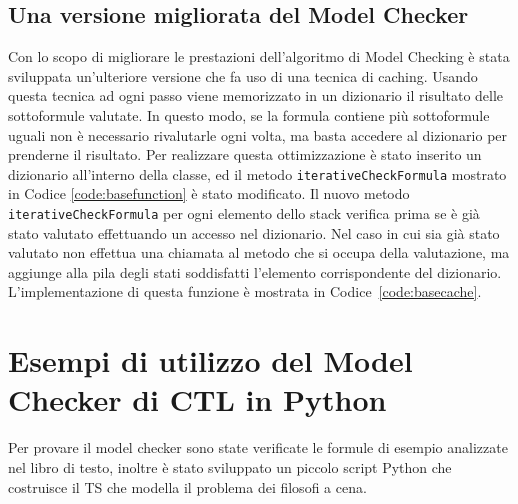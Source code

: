 \documentclass[a4paper, 10pt]{article}
\numberwithin{equation}{theor}
\begin{document}
\subsection{Una versione migliorata del Model Checker}
Con lo scopo di migliorare le prestazioni dell'algoritmo di Model Checking è stata sviluppata un'ulteriore versione che fa uso di una tecnica di caching. Usando questa tecnica ad ogni passo viene memorizzato in un dizionario il risultato delle sottoformule valutate. In questo modo, se la formula contiene più sottoformule uguali non è necessario rivalutarle ogni volta, ma basta accedere al dizionario per prenderne il risultato.
Per realizzare questa ottimizzazione è stato inserito un dizionario all'interno della classe, ed il metodo \texttt{iterativeCheckFormula} mostrato in Codice \ref{code:basefunction} è stato modificato. Il nuovo metodo \texttt{iterativeCheckFormula} per ogni elemento dello stack verifica prima se è già stato valutato effettuando un accesso nel dizionario. Nel caso in cui sia già stato valutato non effettua una chiamata al metodo che si occupa della valutazione, ma aggiunge alla pila degli stati soddisfatti l'elemento corrispondente del dizionario. L'implementazione di questa funzione è mostrata in Codice~\ref{code:basecache}.


\section{Esempi di utilizzo del Model Checker di \ac{CTL} in Python}
Per provare il model checker sono state verificate le formule di esempio analizzate nel libro di testo, inoltre è stato sviluppato un piccolo script Python
che costruisce il \ac{TS} che modella il problema dei filosofi a cena.
\end{document}
